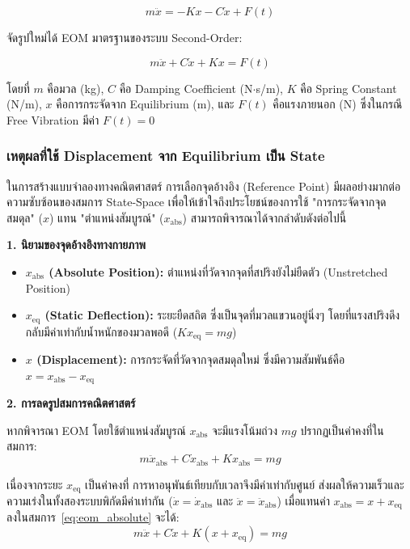 \begin{equation}
    m\ddot{x} = -Kx - C\dot{x} + F(t)
    \label{eq:newton_msd}
\end{equation}

จัดรูปใหม่ได้ EOM มาตรฐานของระบบ Second-Order:

\begin{equation}
    m\ddot{x} + C\dot{x} + Kx = F(t)
    \label{eq:eom_msd}
\end{equation}

โดยที่ $m$ คือมวล (kg), $C$ คือ Damping Coefficient (N$\cdot$s/m),
$K$ คือ Spring Constant (N/m), $x$ คือการกระจัดจาก Equilibrium (m),
และ $F(t)$ คือแรงภายนอก (N) ซึ่งในกรณี Free Vibration มีค่า $F(t) = 0$

\subsubsection{เหตุผลที่ใช้ Displacement จาก Equilibrium เป็น State}

ในการสร้างแบบจำลองทางคณิตศาสตร์ การเลือกจุดอ้างอิง (Reference Point) มีผลอย่างมากต่อความซับซ้อนของสมการ State-Space เพื่อให้เข้าใจถึงประโยชน์ของการใช้ "การกระจัดจากจุดสมดุล" ($x$) แทน "ตำแหน่งสัมบูรณ์" ($x_\text{abs}$) สามารถพิจารณาได้จากลำดับดังต่อไปนี้



\textbf{1. นิยามของจุดอ้างอิงทางกายภาพ}
\begin{itemize}
    \item \textbf{$x_\text{abs}$ (Absolute Position):} ตำแหน่งที่วัดจากจุดที่สปริงยังไม่ยืดตัว (Unstretched Position)
    \item \textbf{$x_\text{eq}$ (Static Deflection):} ระยะยืดสถิต ซึ่งเป็นจุดที่มวลแขวนอยู่นิ่งๆ โดยที่แรงสปริงดึงกลับมีค่าเท่ากับน้ำหนักของมวลพอดี ($K x_\text{eq} = mg$)
    \item \textbf{$x$ (Displacement):} การกระจัดที่วัดจากจุดสมดุลใหม่ ซึ่งมีความสัมพันธ์คือ $x = x_\text{abs} - x_\text{eq}$
\end{itemize}

\textbf{2. การลดรูปสมการคณิตศาสตร์}

หากพิจารณา EOM โดยใช้ตำแหน่งสัมบูรณ์ $x_\text{abs}$ จะมีแรงโน้มถ่วง $mg$ ปรากฏเป็นค่าคงที่ในสมการ:
\begin{equation}
    m\ddot{x}_\text{abs} + C\dot{x}_\text{abs} + K x_\text{abs} = mg
    \label{eq:eom_absolute}
\end{equation}

เนื่องจากระยะ $x_\text{eq}$ เป็นค่าคงที่ การหาอนุพันธ์เทียบกับเวลาจึงมีค่าเท่ากับศูนย์ ส่งผลให้ความเร็วและความเร่งในทั้งสองระบบพิกัดมีค่าเท่ากัน ($\dot{x} = \dot{x}_\text{abs}$ และ $\ddot{x} = \ddot{x}_\text{abs}$) เมื่อแทนค่า $x_\text{abs} = x + x_\text{eq}$ ลงในสมการ~\eqref{eq:eom_absolute} จะได้:
\begin{equation}
    m\ddot{x} + C\dot{x} + K(x + x_\text{eq}) = mg
\end{equation}

